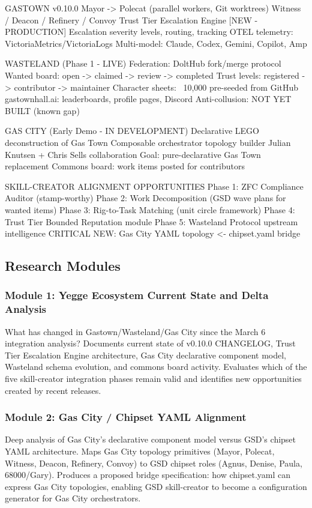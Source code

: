 \documentclass[11pt,letterpaper]{article}
\begin{document}
\begin{asciibox}
GASTOWN v0.10.0
  Mayor -> Polecat (parallel workers, Git worktrees)
  Witness / Deacon / Refinery / Convoy
  Trust Tier Escalation Engine [NEW - PRODUCTION]
  Escalation severity levels, routing, tracking
  OTEL telemetry: VictoriaMetrics/VictoriaLogs
  Multi-model: Claude, Codex, Gemini, Copilot, Amp

WASTELAND (Phase 1 - LIVE)
  Federation: DoltHub fork/merge protocol
  Wanted board: open -> claimed -> review -> completed
  Trust levels: registered -> contributor -> maintainer
  Character sheets: ~10,000 pre-seeded from GitHub
  gastownhall.ai: leaderboards, profile pages, Discord
  Anti-collusion: NOT YET BUILT (known gap)

GAS CITY (Early Demo - IN DEVELOPMENT)
  Declarative LEGO deconstruction of Gas Town
  Composable orchestrator topology builder
  Julian Knutsen + Chris Sells collaboration
  Goal: pure-declarative Gas Town replacement
  Commons board: work items posted for contributors

SKILL-CREATOR ALIGNMENT OPPORTUNITIES
  Phase 1: ZFC Compliance Auditor (stamp-worthy)
  Phase 2: Work Decomposition (GSD wave plans for wanted items)
  Phase 3: Rig-to-Task Matching (unit circle framework)
  Phase 4: Trust Tier Bounded Reputation module
  Phase 5: Wasteland Protocol upstream intelligence
  CRITICAL NEW: Gas City YAML topology <- chipset.yaml bridge
\end{asciibox}

\subsection{Research Modules}

\subsubsection{Module 1: Yegge Ecosystem Current State and Delta Analysis}
What has changed in Gastown/Wasteland/Gas City since the March 6 integration analysis? Documents current state of v0.10.0 CHANGELOG, Trust Tier Escalation Engine architecture, Gas City declarative component model, Wasteland schema evolution, and commons board activity. Evaluates which of the five skill-creator integration phases remain valid and identifies new opportunities created by recent releases.

\subsubsection{Module 2: Gas City / Chipset YAML Alignment}
Deep analysis of Gas City's declarative component model versus GSD's chipset YAML architecture. Maps Gas City topology primitives (Mayor, Polecat, Witness, Deacon, Refinery, Convoy) to GSD chipset roles (Agnus, Denise, Paula, 68000/Gary). Produces a proposed bridge specification: how chipset.yaml can express Gas City topologies, enabling GSD skill-creator to become a configuration generator for Gas City orchestrators.
\end{document}
